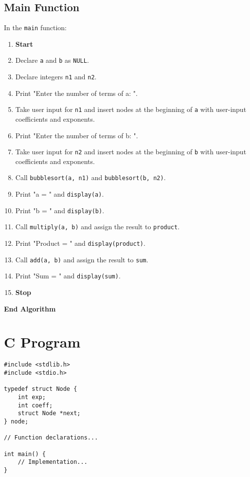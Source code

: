 {  \subsection{Main Function}
  In the \texttt{main} function:
  \begin{enumerate}[label=\arabic*:, start=1]
    \item \textbf{Start}
    \item Declare \texttt{a} and \texttt{b} as \texttt{NULL}.
    \item Declare integers \texttt{n1} and \texttt{n2}.
    \item Print "Enter the number of terms of a: ".
    \item Take user input for \texttt{n1} and insert nodes at the beginning of \texttt{a} with user-input coefficients and exponents.
    \item Print "Enter the number of terms of b: ".
    \item Take user input for \texttt{n2} and insert nodes at the beginning of \texttt{b} with user-input coefficients and exponents.
    \item Call \texttt{bubblesort(a, n1)} and \texttt{bubblesort(b, n2)}.
    \item Print "a = " and \texttt{display(a)}.
    \item Print "b = " and \texttt{display(b)}.
    \item Call \texttt{multiply(a, b)} and assign the result to \texttt{product}.
    \item Print "Product = " and \texttt{display(product)}.
    \item Call \texttt{add(a, b)} and assign the result to \texttt{sum}.
    \item Print "Sum = " and \texttt{display(sum)}.
    \item \textbf{Stop}
  \end{enumerate}
  \textbf{End Algorithm}
 }

\section{C Program}
\begin{lstlisting}[label={list:c_program:polynomial_operations}]
#include <stdlib.h>
#include <stdio.h>

typedef struct Node {
    int exp;
    int coeff;
    struct Node *next;
} node;

// Function declarations...

int main() {
    // Implementation...
}
\end{lstlisting}
